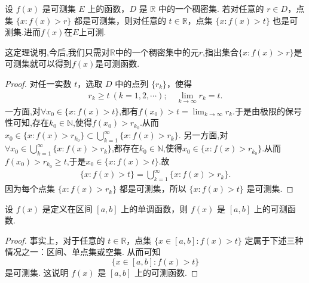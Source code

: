 \documentclass[../../main.tex]{subfiles}%
\begin{document}
\begin{theorem}\label{theorem:定理3.1}
设 \(f(x)\) 是可测集 \(E\) 上的函数，\(D\) 是 \(\mathbb{R}\) 中的一个稠密集. 若对任意的 \(r \in D\)，点集 \(\{x: f(x) > r\}\) 都是可测集，则对任意的 \(t \in \mathbb{R}\)，点集 \(\{x: f(x) > t\}\) 也是可测集.进而$f(x)$在$E$上可测.
\end{theorem}
\begin{note}
这定理说明,今后,我们只需对$\mathbb{R}$中的一个稠密集中的元$r$,指出集合$\{x:f(x)>r\}$是可测集就可以得到$f(x)$是可测函数.
\end{note}
\begin{proof}
对任一实数 \(t\)，选取 \(D\) 中的点列 \(\{r_k\}\)，使得
\begin{align*}
r_k \geqslant t\ (k = 1,2,\cdots); \quad \lim_{k \to \infty}r_k = t.
\end{align*}
一方面,对$\forall x_0\in \{x:f(x)>t\}$,都有$f(x_0)>t=\lim_{k\to \infty}r_k$.于是由极限的保号性可知,存在$k_0\in \mathbb{N}$,使得$f(x_0)>r_{k_0}$.从而$x_0\in \{x:f(x)>r_{k_0}\}\subset \bigcup_{k = 1}^{\infty}\{x: f(x) > r_k\}$.
另一方面,对$\forall x_0\in \bigcup_{k = 1}^{\infty}\{x: f(x) > r_k\}$,都存在$k_0\in \mathbb{N}$,使得$x_0\in \{x:f(x)>r_{k_0}\}$.从而$f(x_0)>r_{k_0}\geqslant  t$,于是$x_0\in \{x:f(x)>t\}$.故
\begin{align}
\{x: f(x) > t\} = \bigcup_{k = 1}^{\infty}\{x: f(x) > r_k\}. \label{eq:3.1}
\end{align}
因为每个点集 \(\{x: f(x) > r_k\}\) 都是可测集，所以 \(\{x: f(x) > t\}\) 是可测集. 
\end{proof}

\begin{proposition}
设 \(f(x)\) 是定义在区间 \([a,b]\) 上的单调函数，则 \(f(x)\) 是 \([a,b]\) 上的可测函数.
\end{proposition}
\begin{proof}
事实上，对于任意的 \(t \in \mathbb{R}\)，点集 \(\{x \in [a,b]: f(x) > t\}\) 定属于下述三种情况之一：区间、单点集或空集. 从而可知
\[
\{x \in [a,b]: f(x) > t\}
\]
是可测集. 这说明 \(f(x)\) 是 \([a,b]\) 上的可测函数. 
\end{proof}
\end{document}
